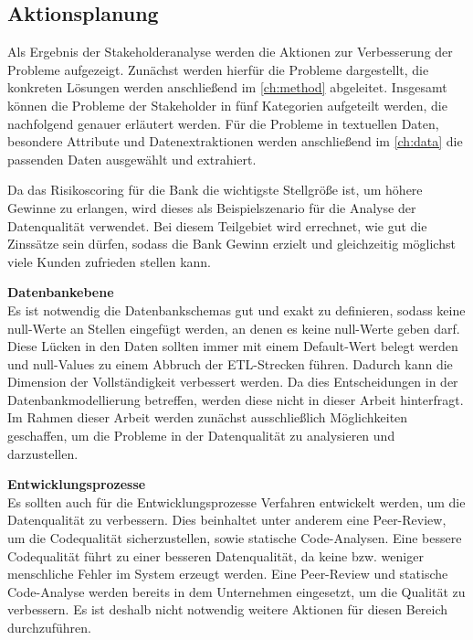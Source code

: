  



\subsection{Aktionsplanung}
Als Ergebnis der Stakeholderanalyse werden die Aktionen zur Verbesserung der Probleme aufgezeigt. 
Zunächst werden hierfür die Probleme dargestellt, die konkreten Lösungen werden anschließend im \autoref{ch:method} abgeleitet.
Insgesamt können die Probleme der Stakeholder in fünf Kategorien aufgeteilt werden, die nachfolgend genauer erläutert werden. 
Für die Probleme in textuellen Daten, besondere Attribute und Datenextraktionen werden anschließend im \autoref{ch:data} die passenden Daten ausgewählt und extrahiert.


Da das Risikoscoring für die Bank die wichtigste Stellgröße ist, um höhere Gewinne zu erlangen, wird dieses als Beispielszenario für die Analyse der Datenqualität verwendet.
Bei diesem Teilgebiet wird errechnet, wie gut die Zinssätze sein dürfen, sodass die Bank Gewinn erzielt und gleichzeitig möglichst viele Kunden zufrieden stellen kann. \cite{petri2005}


\textbf{Datenbankebene} \\
Es ist notwendig die Datenbankschemas gut und exakt zu definieren, sodass keine null-Werte an Stellen eingefügt werden, an denen es keine null-Werte geben darf.
Diese Lücken in den Daten sollten immer mit einem Default-Wert belegt werden und null-Values zu einem Abbruch der ETL-Strecken führen.
Dadurch kann die Dimension der Vollständigkeit verbessert werden.
Da dies Entscheidungen in der Datenbankmodellierung betreffen, werden diese nicht in dieser Arbeit hinterfragt.
Im Rahmen dieser Arbeit werden zunächst ausschließlich Möglichkeiten geschaffen, um die Probleme in der Datenqualität zu analysieren und darzustellen. 


\textbf{Entwicklungsprozesse} \\
Es sollten auch für die Entwicklungsprozesse Verfahren entwickelt werden, um die Datenqualität zu verbessern.
Dies beinhaltet unter anderem eine Peer-Review, um die Codequalität sicherzustellen, sowie statische Code-Analysen.
Eine bessere Codequalität führt zu einer besseren Datenqualität, da keine bzw. weniger menschliche Fehler im System erzeugt werden.
Eine Peer-Review und statische Code-Analyse werden bereits in dem Unternehmen eingesetzt, um die Qualität zu verbessern. 
Es ist deshalb nicht notwendig weitere Aktionen für diesen Bereich durchzuführen.

